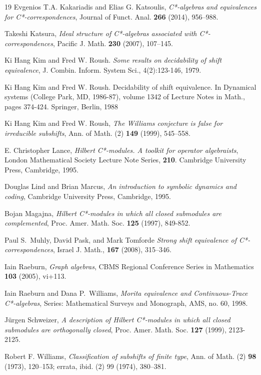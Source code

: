\documentclass[11pt, letterpaper,final]{amsart}
\theoremstyle{definition}
\begin{document}
\begin{thebibliography}{19}
 Evgenios T.A. Kakariadis and Elias G. Katsoulis, \emph{C*-algebras and equivalences for C*-correspondences}, Journal of Funct. Anal. \textbf{266} (2014), 956--988.


 Takeshi Katsura, \emph{Ideal structure of {C*}-algebras associated with {C*}-correspondences}, Pacific J. Math. \textbf{230} (2007), 107--145.


 Ki Hang Kim and Fred W. Roush. \emph{Some results on decidability of shift equivalence}, J. Combin. Inform. System Sci., 4(2):123-146, 1979.

 Ki Hang Kim and Fred W. Roush. Decidability of shift equivalence. In Dynamical systems (College Park, MD, 1986-87), volume 1342 of Lecture Notes in Math., pages 374-424. Springer, Berlin, 1988


		Ki Hang Kim and Fred W. Roush, \emph{The {W}illiams conjecture is false for irreducible subshifts}, Ann. of Math. (2) \textbf{149} (1999), 545--558.


 E. Christopher Lance,
	\emph{Hilbert C*-modules. A toolkit for operator algebraists}, London Mathematical Society Lecture Note Series, \textbf{210}. Cambridge University Press, Cambridge, 1995.
	
 Douglas Lind and Brian Marcus,
\textit{An introduction to symbolic dynamics and coding},
Cambridge University Press, Cambridge, 1995.
	
Bojan Magajna, \emph{Hilbert C*-modules in which all closed submodules are complemented}, Proc. Amer. Math. Soc. \textbf{125} (1997),  849-852.

 Paul S.~Muhly, David Pask, and Mark Tomforde \emph{Strong shift equivalence of  C*-correspondences}, Israel J. Math., \textbf{167} (2008), 315--346.

Iain Raeburn, \emph{Graph algebras}, CBMS Regional Conference Series in Mathematics \textbf{103} (2005), vi+113.

  Iain Raeburn and Dana P.~Williams, \emph{Morita equivalence and Continuous-Trace {C*}-algebras}, Series: Mathematical Surveys and Monograph, AMS, no. 60, 1998.

 J\"{u}rgen Schweizer, \emph{A description of Hilbert {C*}-modules in which all closed submodules are orthogonally closed}, Proc. Amer. Math. Soc. \textbf{127} (1999),  2123-2125.

Robert F. Williams, \emph{Classification of subshifts of finite type}, Ann. of Math. (2) \textbf{98} (1973), 120--153; errata, ibid. (2) 99 (1974), 380--381.

\end{thebibliography}
\end{document}
